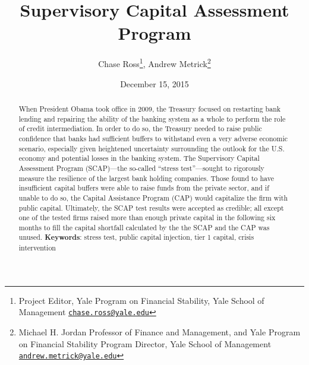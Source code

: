 \documentclass[justified, nobib]{tufte-handout2}
\begin{document}
\lhead{ }

\renewcommand{\headrulewidth}{0.0pt}
\renewcommand{\footrulewidth}{0.0pt}


\title{Supervisory Capital Assessment Program}%
\author{Chase Ross\thanks{ Project Editor, Yale Program on Financial Stability, Yale School of Management \newline \texttt{\href{mailto:chase.ross@yale.edu}{chase.ross@yale.edu}}}, Andrew Metrick\thanks{Michael H. Jordan Professor of Finance and Management, and Yale Program on Financial Stability Program Director, Yale School of Management \newline \texttt{\href{mailto:andrew.metrick@yale.edu}{andrew.metrick@yale.edu}}}}
\date{December 15, 2015}



\maketitle

\begin{abstract}
When President Obama took office in 2009, the Treasury focused on
restarting bank lending and repairing the ability of the banking system
as a whole to perform the role of credit intermediation. In order to do
so, the Treasury needed to raise public confidence that banks had
sufficient buffers to withstand even a very adverse economic scenario,
especially given heightened uncertainty surrounding the outlook for the
U.S. economy and potential losses in the banking system. The Supervisory
Capital Assessment Program (SCAP)---the so-called ``stress
test''---sought to rigorously measure the resilience of the largest bank
holding companies. Those found to have insufficient capital buffers were
able to raise funds from the private sector, and if unable to do so, the
Capital Assistance Program (CAP) would capitalize the firm with public
capital. Ultimately, the SCAP test results were accepted as credible;
all except one of the tested firms raised more than enough private capital in
the following six months to fill the capital shortfall calculated by the
the SCAP and the CAP was unused.
\newline
\newline
\textbf{Keywords}: stress test, public capital injection, tier 1 capital, crisis intervention

\end{abstract}
\newpage
\tableofcontents
\newpage
\end{document}

